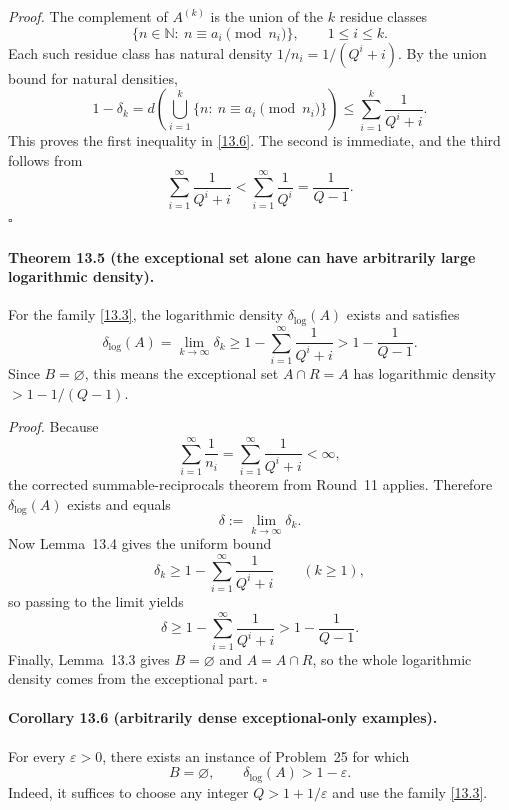 \emph{Proof.}
The complement of \(A^{(k)}\) is the union of the \(k\) residue classes
\[
\{n\in\mathbb N:\ n\equiv a_i\pmod{n_i}\},
\qquad 1\le i\le k.
\]
Each such residue class has natural density \(1/n_i=1/(Q^i+i)\).  By the union bound for natural densities,
\[
1-\delta_k=d\!\left(\bigcup_{i=1}^{k}\{n:\ n\equiv a_i\pmod{n_i}\}\right)
\le \sum_{i=1}^{k}\frac1{Q^i+i}.
\]
This proves the first inequality in \eqref{13.6}.  The second is immediate, and the third follows from
\[
\sum_{i=1}^{\infty}\frac1{Q^i+i}<\sum_{i=1}^{\infty}\frac1{Q^i}=\frac1{Q-1}.
\]
\hfill \(\square\)

\paragraph{Theorem 13.5 (the exceptional set alone can have arbitrarily large logarithmic density).}
For the family \eqref{13.3}, the logarithmic density \(\delta_{\log}(A)\) exists and satisfies
\begin{equation}
\delta_{\log}(A)=\lim_{k\to\infty}\delta_k
\ge 1-\sum_{i=1}^{\infty}\frac1{Q^i+i}
>1-\frac1{Q-1}.
\tag{13.7}
\end{equation}
Since \(B=\varnothing\), this means the exceptional set \(A\cap R=A\) has logarithmic density \(>1-1/(Q-1)\).

\emph{Proof.}
Because
\[
\sum_{i=1}^{\infty}\frac1{n_i}=\sum_{i=1}^{\infty}\frac1{Q^i+i}<\infty,
\]
the corrected summable-reciprocals theorem from Round~11 applies.  Therefore \(\delta_{\log}(A)\) exists and equals
\[
\delta:=\lim_{k\to\infty}\delta_k.
\]
Now Lemma~13.4 gives the uniform bound
\[
\delta_k\ge 1-\sum_{i=1}^{\infty}\frac1{Q^i+i}
\qquad (k\ge 1),
\]
so passing to the limit yields
\[
\delta\ge 1-\sum_{i=1}^{\infty}\frac1{Q^i+i}>1-\frac1{Q-1}.
\]
Finally, Lemma~13.3 gives \(B=\varnothing\) and \(A=A\cap R\), so the whole logarithmic density comes from the exceptional part. \hfill \(\square\)

\paragraph{Corollary 13.6 (arbitrarily dense exceptional-only examples).}
For every \(\varepsilon>0\), there exists an instance of Problem~25 for which
\begin{equation}
B=\varnothing,
\qquad
\delta_{\log}(A)>1-\varepsilon.
\tag{13.8}
\end{equation}
Indeed, it suffices to choose any integer \(Q>1+1/\varepsilon\) and use the family \eqref{13.3}.

